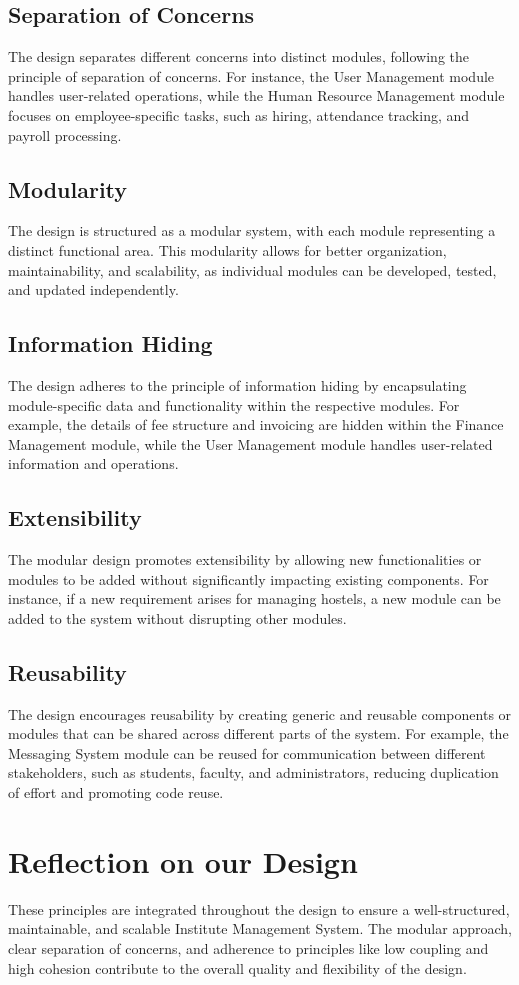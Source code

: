 \documentclass[11pt]{article}
\begin{document}
\subsection{Separation of Concerns}
The design separates different concerns into distinct modules, following the principle of separation of concerns. For instance, the User Management module handles user-related operations, while the Human Resource Management module focuses on employee-specific tasks, such as hiring, attendance tracking, and payroll processing.

\subsection{Modularity}
The design is structured as a modular system, with each module representing a distinct functional area. This modularity allows for better organization, maintainability, and scalability, as individual modules can be developed, tested, and updated independently.

\subsection{Information Hiding}
The design adheres to the principle of information hiding by encapsulating module-specific data and functionality within the respective modules. For example, the details of fee structure and invoicing are hidden within the Finance Management module, while the User Management module handles user-related information and operations.

\subsection{Extensibility}
The modular design promotes extensibility by allowing new functionalities or modules to be added without significantly impacting existing components. For instance, if a new requirement arises for managing hostels, a new module can be added to the system without disrupting other modules.

\subsection{Reusability}
The design encourages reusability by creating generic and reusable components or modules that can be shared across different parts of the system. For example, the Messaging System module can be reused for communication between different stakeholders, such as students, faculty, and administrators, reducing duplication of effort and promoting code reuse.

\section{Reflection on our Design}

These principles are integrated throughout the design to ensure a well-structured, maintainable, and scalable Institute Management System. The modular approach, clear separation of concerns, and adherence to principles like low coupling and high cohesion contribute to the overall quality and flexibility of the design.
\end{document}
